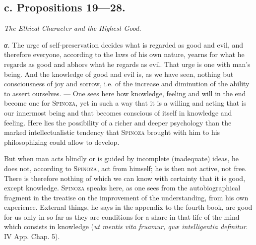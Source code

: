 \documentclass[12pt]{article}
\newcommand{\opage}[1]{\marginnote{\footnotesize\textit{[#1]}}}
\begin{document}
\subsection*{c. Propositions 19---28.}
\begin{center}\textit{The Ethical Character and the Highest Good.}\end{center}

\textit{α.} The urge of self-preservation decides what is regarded as good and evil, and therefore
everyone, according to the laws of his own nature, yearns for what he regards as good and abhors
what he regards as evil. That urge is one with man's being. And the knowledge \opage{76}of good
and evil is, as we have seen, nothing but consciousness of joy and sorrow, i.e. of the increase
and diminution of the ability to assert ourselves. --- One sees here how knowledge, feeling and
will in the end become one for \textsc{Spinoza}, yet in such a way that it is a willing and acting
that is our innermost being and that becomes conscious of itself in knowledge and feeling. Here
lies the possibility of a richer and deeper psychology than the marked intellectualistic tendency
that \textsc{Spinoza} brought with him to his philosophizing could allow to develop.

But when man acts blindly or is guided by incomplete (inadequate) ideas, he does not, according to
\textsc{Spinoza}, act from himself; he is then not active, not free. There is therefore nothing of
which we can know with certainty that it is good, except knowledge. \textsc{Spinoza} speaks here,
as one sees from the autobiographical fragment in the treatise on the improvement of the
understanding, from his own experience. External things, he says in the appendix to the fourth
book, are good for us only in so far as they are conditions for a share in that life of the mind
which consists in knowledge (\textit{ut mentis vita fruamur, qvæ intelligentia definitur}. IV App.
Chap. 5).
\end{document}
